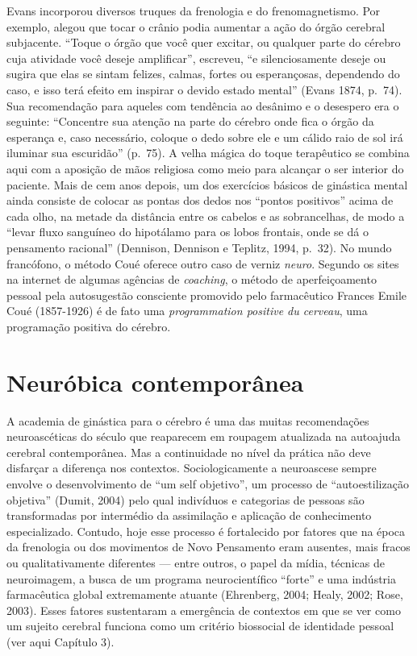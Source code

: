 Evans incorporou diversos truques da frenologia e do frenomagnetismo.
Por exemplo, alegou que tocar o crânio podia aumentar a ação do órgão
cerebral subjacente. ``Toque o órgão que você quer excitar, ou qualquer
parte do cérebro cuja atividade você deseje amplificar'', escreveu, ``e
silenciosamente deseje ou sugira que elas se sintam felizes, calmas,
fortes ou esperançosas, dependendo do caso, e isso terá efeito em
inspirar o devido estado mental'' (Evans 1874, p.~74). Sua recomendação
para aqueles com tendência ao desânimo e o desespero era o seguinte:
``Concentre sua atenção na parte do cérebro onde fica o órgão da
esperança e, caso necessário, coloque o dedo sobre ele e um cálido raio
de sol irá iluminar sua escuridão'' (p.~75). A velha mágica do toque
terapêutico se combina aqui com a aposição de mãos religiosa como meio
para alcançar o ser interior do paciente. Mais de cem anos depois, um
dos exercícios básicos de ginástica mental ainda consiste de colocar as
pontas dos dedos nos ``pontos positivos'' acima de cada olho, na metade
da distância entre os cabelos e as sobrancelhas, de modo a ``levar fluxo
sanguíneo do hipotálamo para os lobos frontais, onde se dá o pensamento
racional'' (Dennison, Dennison e Teplitz, 1994, p.~32). No mundo
francófono, o método Coué oferece outro caso de verniz \emph{neuro}.
Segundo os sites na internet de algumas agências de \emph{coaching}, o
método de aperfeiçoamento pessoal pela autosugestão consciente promovido
pelo farmacêutico Frances Emile Coué (1857-1926) é de fato uma
\emph{programmation positive du cerveau}, uma programação positiva do
cérebro.

\section*{Neuróbica contemporânea}

A academia de ginástica para o cérebro é uma das muitas recomendações
neuroascéticas do século  que reaparecem em roupagem atualizada na
autoajuda cerebral contemporânea. Mas a continuidade no nível da prática
não deve disfarçar a diferença nos contextos. Sociologicamente a
neuroascese sempre envolve o desenvolvimento de ``um self objetivo'', um
processo de ``autoestilização objetiva'' (Dumit, 2004) pelo qual
indivíduos e categorias de pessoas são transformadas por intermédio da
assimilação e aplicação de conhecimento especializado. Contudo, hoje
esse processo é fortalecido por fatores que na época da frenologia ou
dos movimentos de Novo Pensamento eram ausentes, mais fracos ou
qualitativamente diferentes --- entre outros, o papel da mídia, técnicas
de neuroimagem, a busca de um programa neurocientífico ``forte'' e uma
indústria farmacêutica global extremamente atuante (Ehrenberg, 2004;
Healy, 2002; Rose, 2003). Esses fatores sustentaram a emergência de
contextos em que se ver como um sujeito cerebral funciona como um
critério biossocial de identidade pessoal (ver aqui Capítulo 3).

